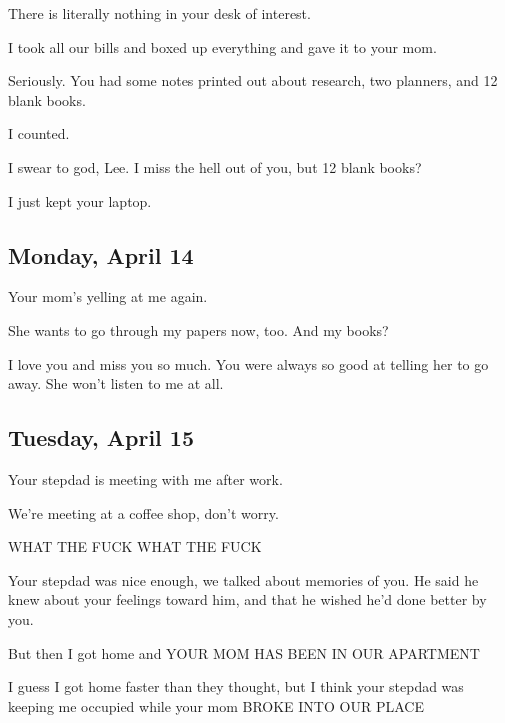 { There is literally nothing in your desk of interest.

 I took all our bills and boxed up everything and gave it to your mom.

 Seriously. You had some notes printed out about research, two planners, and 12 blank books.

 I counted.

 I swear to god, Lee. I miss the hell out of you, but 12 blank books?

 I just kept your laptop.

\newpage

\subsection*{Monday, April 14}\label{monday-april-14}

 Your mom's yelling at me again.

 She wants to go through my papers now, too. And my books?

 I love you and miss you so much. You were always so good at telling her to go away. She won't listen to me at all.

\newpage

\subsection*{Tuesday, April 15}\label{tuesday-april-15}

 Your stepdad is meeting with me after work.

 We're meeting at a coffee shop, don't worry.

 WHAT THE FUCK WHAT THE FUCK

 Your stepdad was nice enough, we talked about memories of you. He said he knew about your feelings toward him, and that he wished he'd done better by you.

 But then I got home and YOUR MOM HAS BEEN IN OUR APARTMENT

 I guess I got home faster than they thought, but I think your stepdad was keeping me occupied while your mom BROKE INTO OUR PLACE

}
